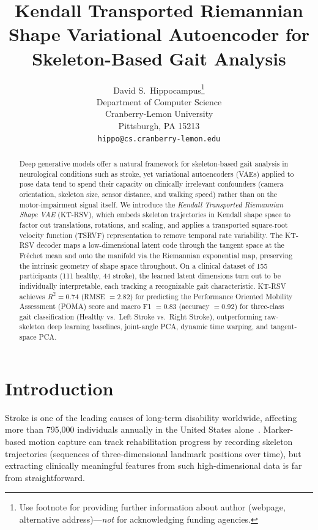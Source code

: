\documentclass{article}
\title{Kendall Transported Riemannian Shape Variational Autoencoder for Skeleton-Based Gait Analysis}
\author{%
  David S.~Hippocampus\thanks{Use footnote for providing further information
    about author (webpage, alternative address)---\emph{not} for acknowledging
    funding agencies.} \\
  Department of Computer Science\\
  Cranberry-Lemon University\\
  Pittsburgh, PA 15213 \\
  \texttt{hippo@cs.cranberry-lemon.edu} \\
}
\begin{document}
\maketitle


\begin{abstract}
Deep generative models offer a natural framework for skeleton-based gait analysis in neurological conditions such as stroke, yet variational autoencoders (VAEs) applied to pose data tend to spend their capacity on clinically irrelevant confounders (camera orientation, skeleton size, sensor distance, and walking speed) rather than on the motor-impairment signal itself. We introduce the \emph{Kendall Transported Riemannian Shape VAE} (KT-RSV), which embeds skeleton trajectories in Kendall shape space to factor out translations, rotations, and scaling, and applies a transported square-root velocity function (TSRVF) representation to remove temporal rate variability. The KT-RSV decoder maps a low-dimensional latent code through the tangent space at the Fr\'{e}chet mean and onto the manifold via the Riemannian exponential map, preserving the intrinsic geometry of shape space throughout. On a clinical dataset of 155 participants (111 healthy, 44 stroke), the learned latent dimensions turn out to be individually interpretable, each tracking a recognizable gait characteristic. KT-RSV achieves $R^2 = 0.74$ (RMSE $= 2.82$) for predicting the Performance Oriented Mobility Assessment (POMA) score and macro F1 $= 0.83$ (accuracy $= 0.92$) for three-class gait classification (Healthy vs.\ Left Stroke vs.\ Right Stroke), outperforming raw-skeleton deep learning baselines, joint-angle PCA, dynamic time warping, and tangent-space PCA.
\end{abstract}



\section{Introduction}

Stroke is one of the leading causes of long-term disability worldwide, affecting more than 795,000 individuals annually in the United States alone~\cite{van2023full}. Marker-based motion capture can track rehabilitation progress by recording skeleton trajectories (sequences of three-dimensional landmark positions over time), but extracting clinically meaningful features from such high-dimensional data is far from straightforward.
\end{document}
